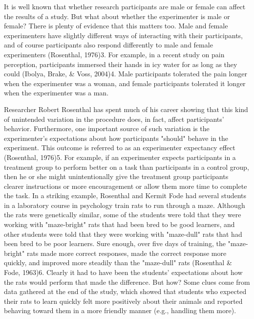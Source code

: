 \color{fgcolor}\begin{kframe}


It is well known that whether research participants are male or female can affect the results of a study. But what about whether the experimenter is male or female? There is plenty of evidence that this matters too. Male and female experimenters have slightly different ways of interacting with their participants, and of course participants also respond differently to male and female experimenters (Rosenthal, 1976)3.
For example, in a recent study on pain perception, participants immersed their hands in icy water for as long as they could (Ibolya, Brake, \& Voss, 2004)4. Male participants tolerated the pain longer when the experimenter was a woman, and female participants tolerated it longer when the experimenter was a man.
\end{kframe}

Researcher Robert Rosenthal has spent much of his career showing that this kind of unintended variation in the procedure does, in fact, affect participants' behavior. Furthermore, one important source of such variation is the experimenter's expectations about how participants "should" behave in the experiment. This outcome is referred to as an experimenter expectancy effect (Rosenthal, 1976)5. For example, if an experimenter expects participants in a treatment group to perform better on a task than participants in a control group, then he or she might unintentionally give the treatment group participants clearer instructions or more encouragement or allow them more time to
complete the task. In a striking example, Rosenthal and Kermit Fode had several students in a laboratory course in psychology train rats to run through a maze. Although the rats were genetically similar, some of the students were told that they were working with "maze-bright" rats that had been bred to be good learners, and other students were told that they were working with "maze-dull" rats that had been bred to be poor learners. Sure enough, over five days of training, the "maze-bright" rats made more correct responses, made the correct response more quickly, and improved more steadily than the "maze-dull" rats (Rosenthal \& Fode, 1963)6. Clearly it had to have been the students' expectations about how the rats would perform that made the difference. But how? Some clues come from data gathered at the end of the study, which showed that students who expected their rats to learn quickly felt more positively about their animals and reported behaving toward them in a more friendly manner (e.g., handling them more).

